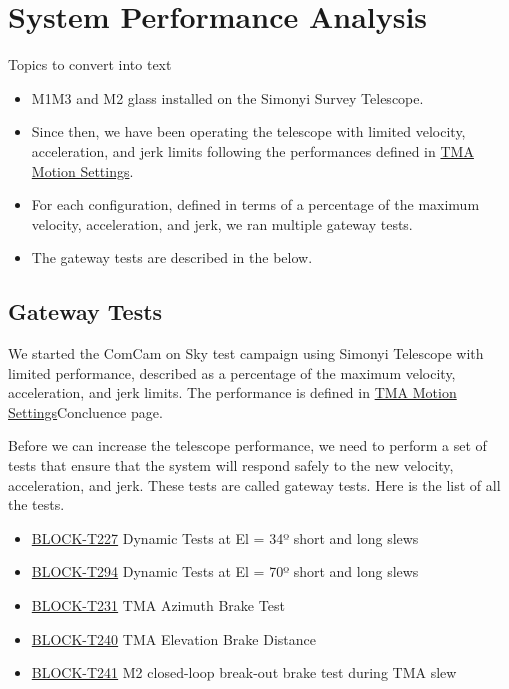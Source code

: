 \section{System Performance Analysis}
\label{sec:system_performance_analysis}

\newcommand{\TMAMotionSettings}{\href{https://rubinobs.atlassian.net/wiki/spaces/LSSTCOM/pages/53741249/TMA+Motion+Settings}{TMA Motion Settings}}
\newcommand{\testCase}[1]{\href{https://rubinobs.atlassian.net/projects/BLOCK?selectedItem=com.atlassian.plugins.atlassian-connect-plugin:com.kanoah.test-manager__main-project-page\#!/v2/testCase/#1}{#1}}

Topics to convert into text

\begin{itemize}
    \item M1M3 and M2 glass installed on the Simonyi Survey Telescope.
    \item Since then, we have been operating the telescope with limited velocity,
    acceleration, and jerk limits following the performances defined in \TMAMotionSettings.
    \item For each configuration, defined in terms of a percentage of the maximum
    velocity, acceleration, and jerk, we ran multiple gateway tests.
    \item The gateway tests are described in the  below.
\end{itemize}

\subsection{Gateway Tests}
\label{sec:gateway_tests}

We started the ComCam on Sky test campaign using Simonyi Telescope with limited
performance, described as a percentage of the maximum velocity, acceleration,
and jerk limits. The performance is defined in \TMAMotionSettings Concluence page.

Before we can increase the telescope performance, we need to perform a set of
tests that ensure that the system will respond safely to the new velocity, acceleration,
and jerk. These tests are called gateway tests. Here is the list of all the tests.

\begin{itemize}
    \item \testCase{BLOCK-T227} Dynamic Tests at El = 34º short and long slews
    \item \testCase{BLOCK-T294} Dynamic Tests at El = 70º short and long slews
    \item \testCase{BLOCK-T231} TMA Azimuth Brake Test
    \item \testCase{BLOCK-T240} TMA Elevation Brake Distance
    \item \testCase{BLOCK-T241} M2 closed-loop break-out brake test during TMA slew
\end{itemize}


